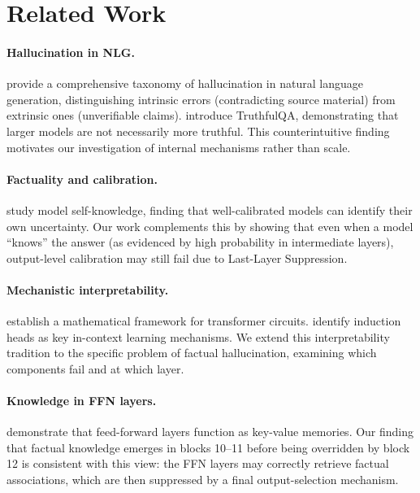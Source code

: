 \documentclass[11pt,a4paper]{article}
\begin{document}
\section{Related Work}

\paragraph{Hallucination in NLG.}
\citet{ji2023survey} provide a comprehensive taxonomy of
hallucination in natural language generation, distinguishing
intrinsic errors (contradicting source material) from extrinsic
ones (unverifiable claims). \citet{lin2022truthfulqa} introduce
TruthfulQA, demonstrating that larger models are not necessarily
more truthful. This counterintuitive finding motivates our
investigation of internal mechanisms rather than scale.

\paragraph{Factuality and calibration.}
\citet{kadavath2022language} study model self-knowledge,
finding that well-calibrated models can identify their own
uncertainty. Our work complements this by showing that even
when a model ``knows'' the answer (as evidenced by high
probability in intermediate layers), output-level calibration
may still fail due to Last-Layer Suppression.

\paragraph{Mechanistic interpretability.}
\citet{elhage2021mathematical} establish a mathematical
framework for transformer circuits. \citet{olsson2022context}
identify induction heads as key in-context learning mechanisms.
We extend this interpretability tradition to the specific problem
of factual hallucination, examining which components fail and
at which layer.

\paragraph{Knowledge in FFN layers.}
\citet{geva2021transformer} demonstrate that feed-forward
layers function as key-value memories. Our finding that factual
knowledge emerges in blocks 10--11 before being overridden by
block 12 is consistent with this view: the FFN layers may
correctly retrieve factual associations, which are then
suppressed by a final output-selection mechanism.
\end{document}
